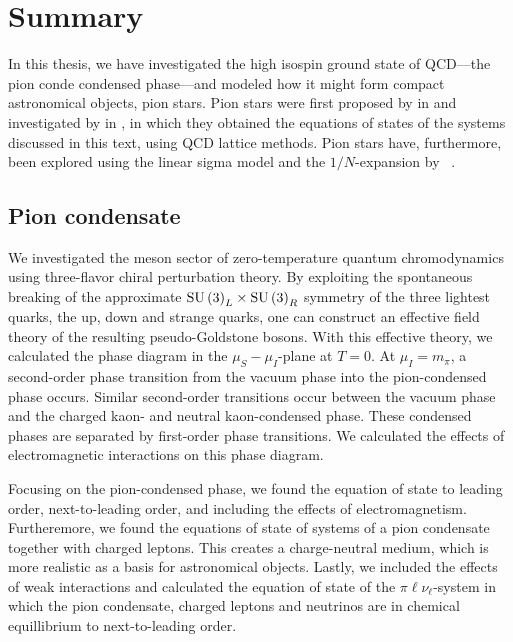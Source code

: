 \section{Summary}


In this thesis, we have investigated the high isospin ground state of QCD---the pion conde condensed phase---and modeled how it might form compact astronomical objects, pion stars.
Pion stars were first proposed by \citeauthor{carignanoScrutinizingPionCondensed2017} in \autocite{carignanoScrutinizingPionCondensed2017} and investigated by \citeauthor{brandtNewClassCompact2018} in \autocite{brandtNewClassCompact2018}, in which they obtained the equations of states of the systems discussed in this text, using QCD lattice methods.
Pion stars have, furthermore, been explored using the linear sigma model and the $1/N$-expansion by \citeauthor{andersenBoseEinsteinCondensationPion2018}~\autocite{andersenBoseEinsteinCondensationPion2018}.


\subsection{Pion condensate}

We investigated the meson sector of zero-temperature quantum chromodynamics using three-flavor chiral perturbation theory.
By exploiting the spontaneous breaking of the approximate $\text{SU}\left(3\right)_L\times\text{SU}\left(3\right)_R$ symmetry of the three lightest quarks, the up, down and strange quarks, one can construct an effective field theory of the resulting pseudo-Goldstone bosons.
With this effective theory, we calculated the phase diagram in the $\mu_S-\mu_I$-plane at $T = 0$.
At $\mu_I = m_\pi$, a second-order phase transition from the vacuum phase into the pion-condensed phase occurs.
Similar second-order transitions occur between the vacuum phase and the charged kaon- and neutral kaon-condensed phase.
These condensed phases are separated by first-order phase transitions.
We calculated the effects of electromagnetic interactions on this phase diagram.

Focusing on the pion-condensed phase, we found the equation of state to leading order, next-to-leading order, and including the effects of electromagnetism.
Furtheremore, we found the equations of state of systems of a pion condensate together with charged leptons.
This creates a charge-neutral medium, which is more realistic as a basis for astronomical objects.
Lastly, we included the effects of weak interactions and calculated the equation of state of the $\pi\ell\nu_\ell$-system in which the pion condensate, charged leptons and neutrinos are in chemical equillibrium to next-to-leading order.


